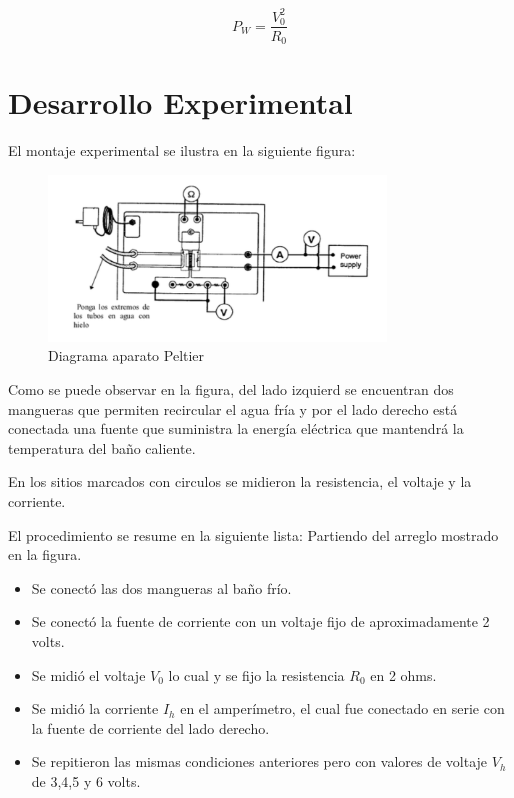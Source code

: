 \documentclass[12pt]{article}
\begin{document}
\begin{equation}
P_W = \frac{V_0^2}{R_0}
\end{equation}
\vspace{-0.5cm}
\section{Desarrollo Experimental}
\vspace{-0.5cm}
El montaje experimental se ilustra en la siguiente figura:

\begin{figure}[H]
\begin{center}
\includegraphics[width=0.8\textwidth]{Arreglo.png}  
\caption{Diagrama aparato Peltier}
\label{one}
\end{center}
\end{figure}

Como se puede observar en la figura, del lado izquierd se encuentran dos mangueras que permiten recircular el agua fría y por el lado derecho está conectada una fuente que suministra la energía eléctrica que mantendrá la temperatura del baño caliente.

En los sitios marcados con circulos se midieron la resistencia, el voltaje y la corriente.

El procedimiento se resume en la siguiente lista:
Partiendo del arreglo mostrado en la figura.
\begin{itemize}
\item Se conectó las dos mangueras al baño frío.
\item Se conectó la fuente de corriente con un voltaje fijo de
aproximadamente 2 volts.
\item Se midió el voltaje $V_0$ lo cual y se fijo la resistencia $R_0$ en 2 ohms.
\item Se midió la corriente $I_h$ en el amperímetro, el cual fue conectado en serie con la fuente de corriente del lado derecho.
\item Se repitieron las mismas condiciones anteriores pero con valores de voltaje $V_h$ de 3,4,5 y 6 volts.
\end{itemize}
\end{document}
